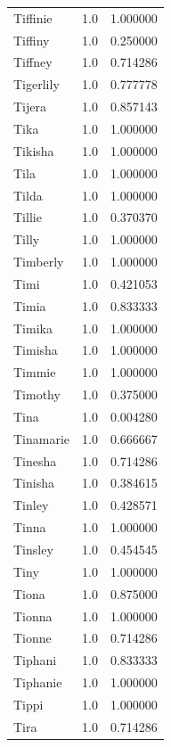 \documentclass[
  letterpaper,
  DIV=11,
  numbers=noendperiod]{scrreprt}
\begin{document}
\begin{tabular}{lrr}
Tiffinie        &   1.0 &   1.000000 \\
Tiffiny         &   1.0 &   0.250000 \\
Tiffney         &   1.0 &   0.714286 \\
Tigerlily       &   1.0 &   0.777778 \\
Tijera          &   1.0 &   0.857143 \\
Tika            &   1.0 &   1.000000 \\
Tikisha         &   1.0 &   1.000000 \\
Tila            &   1.0 &   1.000000 \\
Tilda           &   1.0 &   1.000000 \\
Tillie          &   1.0 &   0.370370 \\
Tilly           &   1.0 &   1.000000 \\
Timberly        &   1.0 &   1.000000 \\
Timi            &   1.0 &   0.421053 \\
Timia           &   1.0 &   0.833333 \\
Timika          &   1.0 &   1.000000 \\
Timisha         &   1.0 &   1.000000 \\
Timmie          &   1.0 &   1.000000 \\
Timothy         &   1.0 &   0.375000 \\
Tina            &   1.0 &   0.004280 \\
Tinamarie       &   1.0 &   0.666667 \\
Tinesha         &   1.0 &   0.714286 \\
Tinisha         &   1.0 &   0.384615 \\
Tinley          &   1.0 &   0.428571 \\
Tinna           &   1.0 &   1.000000 \\
Tinsley         &   1.0 &   0.454545 \\
Tiny            &   1.0 &   1.000000 \\
Tiona           &   1.0 &   0.875000 \\
Tionna          &   1.0 &   1.000000 \\
Tionne          &   1.0 &   0.714286 \\
Tiphani         &   1.0 &   0.833333 \\
Tiphanie        &   1.0 &   1.000000 \\
Tippi           &   1.0 &   1.000000 \\
Tira            &   1.0 &   0.714286 \\

\end{tabular}
\end{document}
